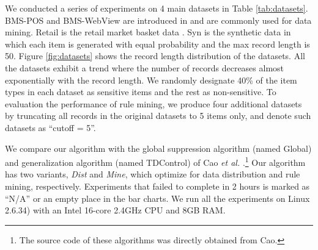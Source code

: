 We conducted a series of experiments on
4 main datasets in Table \ref{tab:datasets}. BMS-POS and BMS-WebView are
introduced in \cite{Zheng:2001:RWP:502512.502572} and are commonly used for
data mining. Retail is the retail market basket data \cite{brijs99:retailData}. Syn is the synthetic data in which each item is generated with 
equal probability and the max record length is 50.
%
Figure \ref{fig:datasets} shows the record length distribution of the datasets.
All the datasets exhibit a trend where the number of records decreases almost exponentially
with the record length.
%
We randomly designate 40\% of the item types in each dataset as
sensitive items and the rest as non-sensitive.
%
To evaluation the performance of rule mining,
we produce four additional datasets by truncating all records in the
original datasets to 5 items only, and denote
such datasets as ``cutoff = 5''.

We compare our algorithm with the
global suppression algorithm (named Global) and generalization algorithm 
(named TDControl) of
Cao {\em et al.} \cite{Cao:2010:rho}.\footnote{The source code of these
algorithms was directly obtained from Cao.} 
Our algorithm has two variants, {\em Dist} and {\em Mine}, which optimize
for data distribution and rule mining, respectively.
Experiments that failed to complete in 2 hours is marked
as ``N/A'' or an empty place in the bar charts.
We run all the experiments on Linux 2.6.34)
with an Intel 16-core 2.4GHz CPU and 8GB RAM. 

